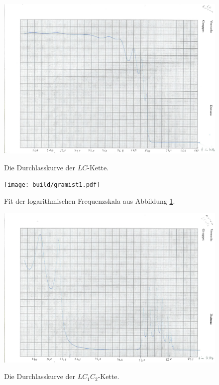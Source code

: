    \begin{figure}
   	\centering
   	\caption{Die Durchlasskurve der $LC$-Kette.}
   	\includegraphics[width=\linewidth-70pt,height=\textheight-70pt,keepaspectratio]{content/Scans/LC.png}
   	\label{fig:Lc}
   \end{figure}
   \begin{figure}
   	\centering
   	\caption{Fit der logarithmischen Frequenzskala aus Abbildung \ref{fig:Lc}.}
   	\texttt{[image: build/gramist1.pdf]}
   	\label{fig:LcMist}
   \end{figure}
	\begin{figure}
		\centering
		\caption{Die Durchlasskurve der $LC_1C_2$-Kette.}
		\includegraphics[width=\linewidth-70pt,height=\textheight-70pt,keepaspectratio]{content/Scans/LC1C2.png}
		\label{fig:Lc1c2}
	\end{figure}
